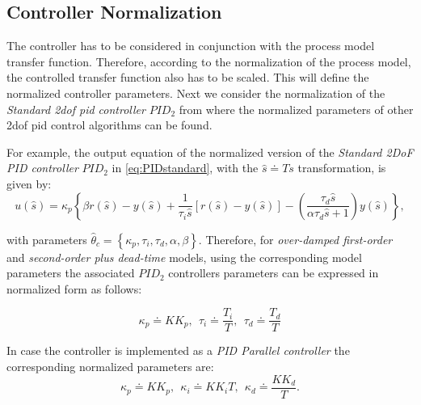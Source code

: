 \subsection{Controller Normalization}
\label{sec:4.2}
%
The controller has to be considered in conjunction with the process model transfer function. Therefore, according to the normalization of the process model, the controlled transfer function also has to be scaled. This will define the normalized controller parameters. Next we consider the normalization of the \emph{Standard \gls{2dof} \gls{pid} controller} $PID_2$ from where the normalized parameters of other \gls{2dof} \gls{pid} control algorithms can be found.

For example, the output equation of the normalized version of the \emph{Standard 2DoF PID controller} $PID_2$ in \eqref{eq:PIDstandard}, with the $\hat s \doteq T s$ transformation, is given by:
\begin{equation}
	u(\hat s) = \kappa_p \left\{\beta r(\hat s)-y(\hat s) + \frac{1}{\tau_i \hat s} \left[r(\hat s)-y(\hat s)\right] - \left(\frac{\tau_d \hat s}{\alpha \tau_d \hat s+1}\right) y(\hat s)\right\},
\end{equation}

\noindent with parameters $\hat{\theta}_c = \left\{\kappa_p, \tau_i, \tau_d, \alpha, \beta \right\}$. Therefore,  for \emph{over-damped first-order} and \emph{second-order plus dead-time}  models, using the corresponding model parameters the associated $PID_2$ controllers parameters can be expressed in normalized form as follows:

\begin{equation}
	\kappa_p \doteq K K_p, \ \ \tau_i \doteq \frac{T_i}{T}, \ \ \tau_d \doteq \frac{T_d}{T} 
	\label{Ch2eq:PIDNormalized}
\end{equation}

In case the controller is implemented as a \emph{PID Parallel controller} the corresponding normalized parameters are:
\begin{equation}
	\kappa_p \doteq K K_p, \ \ \kappa_i \doteq K K_i T, \ \ \kappa_d \doteq \frac{K K_d}{T}.	
\end{equation}


